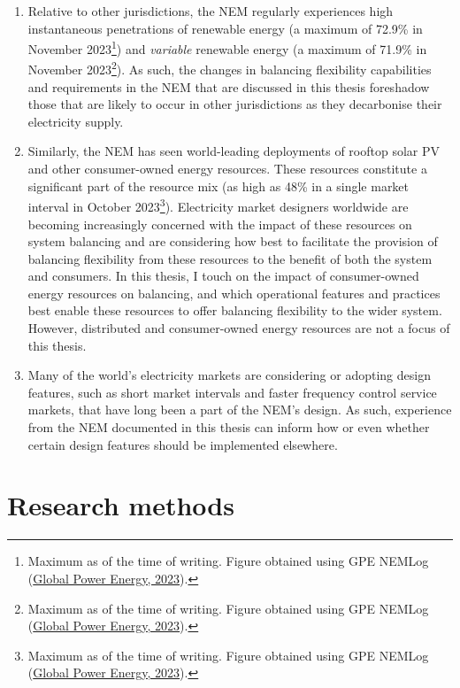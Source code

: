 \documentclass[12pt,a4paper,]{report}
\providecommand{\tightlist}{%
  \setlength{\itemsep}{0pt}\setlength{\parskip}{0pt}}
\begin{document}
\begin{enumerate}
\def\labelenumi{\arabic{enumi}.}
\tightlist
\item
  Relative to other jurisdictions, the NEM regularly experiences high
  instantaneous penetrations of renewable energy (a maximum of 72.9\% in
  November 2023\footnote{Maximum as of the time of writing. Figure
    obtained using GPE NEMLog
    (\protect\hyperlink{ref-globalpowerenergyWelcomeGPENEMLog22023}{Global
    Power Energy, 2023}).}) and \emph{variable} renewable energy (a
  maximum of 71.9\% in November 2023\footnote{Maximum as of the time of
    writing. Figure obtained using GPE NEMLog
    (\protect\hyperlink{ref-globalpowerenergyWelcomeGPENEMLog22023}{Global
    Power Energy, 2023}).}). As such, the changes in balancing
  flexibility capabilities and requirements in the NEM that are
  discussed in this thesis foreshadow those that are likely to occur in
  other jurisdictions as they decarbonise their electricity supply.
\item
  Similarly, the NEM has seen world-leading deployments of rooftop solar
  PV and other consumer-owned energy resources. These resources
  constitute a significant part of the resource mix (as high as 48\% in
  a single market interval in October 2023\footnote{Maximum as of the
    time of writing. Figure obtained using GPE NEMLog
    (\protect\hyperlink{ref-globalpowerenergyWelcomeGPENEMLog22023}{Global
    Power Energy, 2023}).}). Electricity market designers worldwide are
  becoming increasingly concerned with the impact of these resources on
  system balancing and are considering how best to facilitate the
  provision of balancing flexibility from these resources to the benefit
  of both the system and consumers. In this thesis, I touch on the
  impact of consumer-owned energy resources on balancing, and which
  operational features and practices best enable these resources to
  offer balancing flexibility to the wider system. However, distributed
  and consumer-owned energy resources are not a focus of this thesis.
\item
  Many of the world's electricity markets are considering or adopting
  design features, such as short market intervals and faster frequency
  control service markets, that have long been a part of the NEM's
  design. As such, experience from the NEM documented in this thesis can
  inform how or even whether certain design features should be
  implemented elsewhere.
\end{enumerate}

\hypertarget{research-methods}{%
\section{Research methods}\label{research-methods}}
\end{document}
